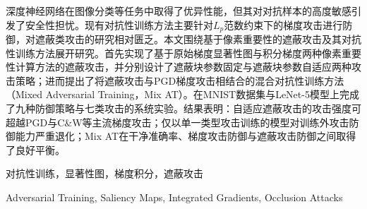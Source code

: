 

\begin{zhaiyao}
\begin{spacing}{1.5}
{

深度神经网络在图像分类等任务中取得了优异性能，但其对对抗样本的高度敏感引发了安全性担忧。现有对抗性训练方法主要针对$L_p$范数约束下的梯度攻击进行防御，对遮蔽类攻击的研究相对匮乏。本文围绕基于像素重要性的遮蔽攻击及其对抗性训练方法展开研究。首先实现了基于原始梯度显著性图与积分梯度两种像素重要性计算方法的遮蔽攻击，并分别设计了遮蔽块参数固定与遮蔽块参数自适应两种攻击策略；进而提出了将遮蔽攻击与PGD梯度攻击相结合的混合对抗性训练方法（Mixed Adversarial Training，Mix AT）。在MNIST数据集与LeNet-5模型上完成了九种防御策略与七类攻击的系统实验。结果表明：自适应遮蔽攻击的攻击强度可超越PGD与C\&W等主流梯度攻击；仅以单一类型攻击训练的模型对训练外攻击防御能力严重退化；Mix AT在干净准确率、梯度攻击防御与遮蔽攻击防御之间取得了良好平衡。

}

\end{spacing}
\end{zhaiyao}




\begin{guanjianci}
对抗性训练，显著性图，梯度积分，遮蔽攻击
\end{guanjianci}



\begin{abstract}
\begin{spacing}{1.5}
Deep neural networks have achieved remarkable performance in tasks such as image classification, yet their vulnerability to adversarial examples raises serious security concerns. Most existing adversarial training methods focus on gradient-based attacks under $L_p$-norm constraints, while defenses against occlusion attacks remain relatively underexplored. This thesis investigates pixel importance-based occlusion attacks and the corresponding adversarial training methods. We first implement occlusion attacks built on two pixel importance estimation methods—gradient saliency maps and Integrated Gradients(IG)—and design both fixed and adaptive occlusion strategies. We then propose a mixed adversarial training method (Mixed Adversarial Training, Mix AT) that combines occlusion attacks with PGD gradient attacks. Systematic experiments are conducted on the MNIST dataset with LeNet-5, evaluating nine defense strategies against seven types of attacks. The results show that adaptive occlusion attacks can surpass mainstream gradient attacks such as PGD and C\&W in attack strength; models trained with a single type of attack suffer severe degradation against unseen attacks; Mix AT achieves a favorable balance among clean accuracy, robustness to gradient attacks, and robustness to occlusion attacks.

\end{spacing}
\end{abstract}


\begin{keywords}
Adversarial Training, Saliency Maps, Integrated Gradients, Occlusion Attacks
\end{keywords}
